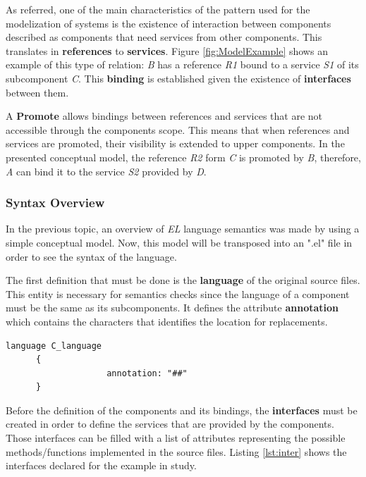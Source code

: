 As referred, one of the main characteristics of the pattern used for the modelization of systems is the existence of interaction between components described as components that need services from other components. This translates in \textbf{references} to \textbf{services}. Figure \ref{fig:ModelExample} shows an example of this type of relation: \textit{B} has a reference \textit{R1} bound to a service \textit{S1} of its subcomponent \textit{C}. This \textbf{binding} is established given the existence of \textbf{interfaces} between them. 

A \textbf{Promote} allows bindings between references and services that are not accessible through the components scope. This means that when references and services are promoted, their visibility is extended to upper components. In the presented conceptual model, the reference \textit{R2} form \textit{C} is promoted by \textit{B}, therefore, \textit{A} can bind it to the service \textit{S2} provided by \textit{D}.


\subsubsection{Syntax Overview}

In the previous topic, an overview of  \textit{EL} language semantics was made by using a simple conceptual model. Now, this model will be transposed into an ".el" file in order to see the syntax of the language. 


The first definition that must be done is the \textbf{language} of the original source files. This entity is necessary for semantics checks since the language of a component must be the same as its subcomponents. It defines the attribute \textbf{annotation} which contains the characters that identifies the location for replacements. 
\begin{lstlisting}[language=EL, caption={Language definition in .el file}, label=lst:lang]
      language C_language
      {	
      				annotation: "##"	
      }    
\end{lstlisting}


Before the definition of the components and its bindings, the \textbf{interfaces} must be created in order to define the services that are provided by the components. Those interfaces can be filled with a list of attributes representing the possible methods/functions implemented in the source files. Listing \ref{lst:inter} shows the interfaces declared for the example in study.

